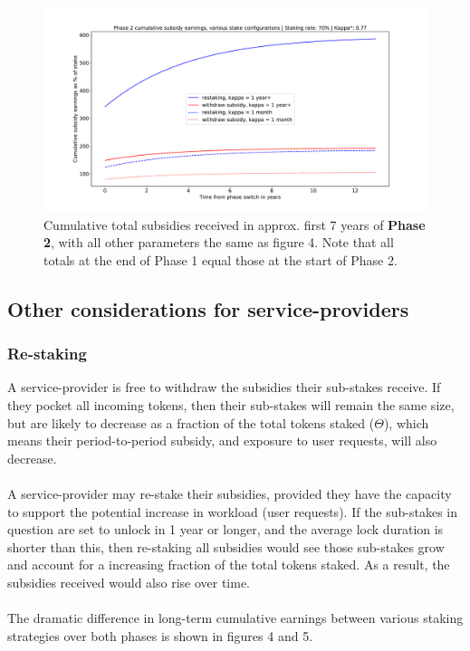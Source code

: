 \documentclass[longbibliography,nofootinbib]{revtex4-1}
\begin{document}
\begin{figure}[h!]
    \includegraphics[width=\textwidth]{graphs/SubsidyP2.pdf}
    \caption{Cumulative total subsidies received in approx. first 7 years of \textbf{Phase 2}, with all other parameters the same as figure 4. Note that all totals at the end of Phase 1 equal those at the start of Phase 2.}
    \label{fig:tp}
\end{figure}

\subsection{Other considerations for service-providers}

\subsubsection{Re-staking}

A service-provider is free to withdraw the subsidies their sub-stakes receive. If they pocket all incoming tokens, then their sub-stakes will remain the same size, but are likely to decrease as a fraction of the total tokens staked ($\Theta$), which means their period-to-period subsidy, and exposure to user requests, will also decrease. 
\\\\
A service-provider may re-stake their subsidies, provided they have the capacity to support the potential increase in workload (user requests). If the sub-stakes in question are set to unlock in 1 year or longer, and the average lock duration is shorter than this, then re-staking all subsidies would see those sub-stakes grow and account for a increasing fraction of the total tokens staked. As a result, the subsidies received would also rise over time. \\\\
The dramatic difference in long-term  cumulative earnings between various staking strategies over both phases is shown in figures 4 and 5. 
\end{document}
